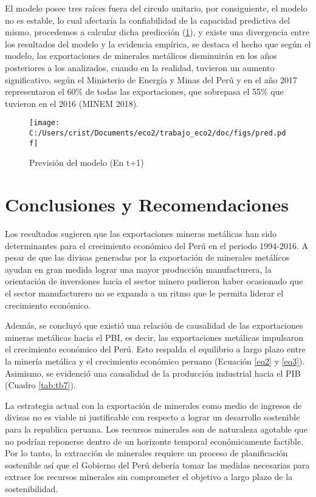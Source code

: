 \documentclass[11pt,]{article}
\begin{document}
El modelo posee tres raíces fuera del circulo unitario, por
consiguiente, el modelo no es estable, lo cual afectaría la
confiabilidad de la capacidad predictiva del mismo, procedemos a
calcular dicha predicción (\ref{fig:plot2}), y existe
una divergencia entre los resultados del modelo y la evidencia empírica,
se destaca el hecho que según el modelo, las exportaciones de minerales
metálicos disminuirán en los años posteriores a los analizados, cuando
en la realidad, tuvieron un aumento significativo, según el Ministerio
de Energía y Minas del Perú y en el año 2017 representaron el 60\% de
todas las exportaciones, que sobrepasa el 55\% que tuvieron en el 2016
(MINEM 2018).

\begin{figure}[h]
\centering
\texttt{[image: C:/Users/crist/Documents/eco2/trabajo\_eco2/doc/figs/pred.pdf]}
\caption{\label{fig:plot2} Previsión del modelo (En t+1)}
\end{figure}

\hypertarget{conclusiones}{%
\section{Conclusiones y Recomendaciones}\label{conclusiones}}

Los resultados sugieren que las exportaciones mineras metálicas han sido
determinantes para el crecimiento económico del Perú en el periodo
1994-2016. A pesar de que las divisas generadas por la exportación de
minerales metálicos ayudan en gran medida lograr una mayor producción
manufacturera, la orientación de inversiones hacia el sector minero
pudieron haber ocasionado que el sector manufacturero no se expanda a un
ritmo que le permita liderar el crecimiento económico.

Además, se concluyó que existió una relación de causalidad de las
exportaciones mineras metálicas hacia el PBI, es decir, las
exportaciones metálicas impulsaron el crecimiento económico del Perú.
Esto respalda el equilibrio a largo plazo entre la minería metálica y el
crecimiento económico peruano (Ecuación \ref{eq2} y \ref{eq3}).
Asimismo, se evidenció una causalidad de la producción industrial hacia
el PIB (Cuadro \ref{tab:tb7}).

La estrategia actual con la exportación de minerales como medio de
ingresos de divisas no es viable ni justificable con respecto a lograr
un desarrollo sostenible para la republica peruana. Los recursos
minerales son de naturaleza agotable que no podrían reponerse dentro de
un horizonte temporal económicamente factible. Por lo tanto, la
extracción de minerales requiere un proceso de planificación sostenible
así que el Gobierno del Perú debería tomar las medidas necesarias para
extraer los recursos minerales sin comprometer el objetivo a largo plazo
de la sostenibilidad.
\end{document}
